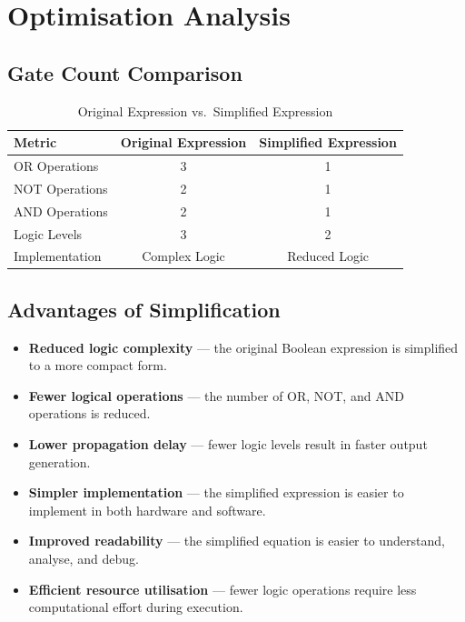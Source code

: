 \documentclass[12pt,a4paper]{article}
\begin{document}
\section{Optimisation Analysis}

\subsection{Gate Count Comparison}

\begin{table}[H]
\centering
\begin{tabular}{lcc}
\toprule
\textbf{Metric} &
\textbf{Original Expression} &
\textbf{Simplified Expression} \\
\midrule
OR Operations & 3 & 1 \\
NOT Operations & 2 & 1 \\
AND Operations & 2 & 1 \\
Logic Levels & 3 & 2 \\
Implementation & Complex Logic & Reduced Logic \\
\bottomrule
\end{tabular}
\caption{Original Expression vs.\ Simplified Expression}
\end{table}

\subsection{Advantages of Simplification}

\begin{itemize}
    \item \textbf{Reduced logic complexity} --- the original Boolean expression is simplified to a more compact form.

    \item \textbf{Fewer logical operations} --- the number of OR, NOT, and AND operations is reduced.

    \item \textbf{Lower propagation delay} --- fewer logic levels result in faster output generation.

    \item \textbf{Simpler implementation} --- the simplified expression is easier to implement in both hardware and software.

    \item \textbf{Improved readability} --- the simplified equation is easier to understand, analyse, and debug.

    \item \textbf{Efficient resource utilisation} --- fewer logic operations require less computational effort during execution.
\end{itemize}
\end{document}
